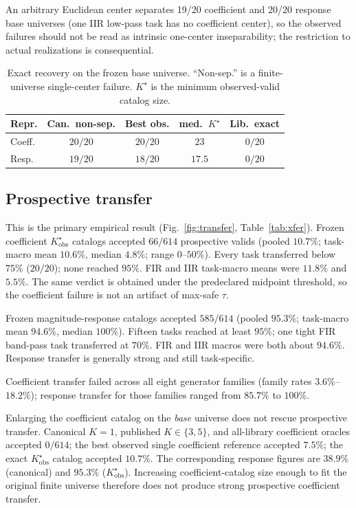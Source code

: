 \documentclass{article}
\begin{document}
An arbitrary Euclidean center separates 19/20 coefficient and
20/20 response base universes (one IIR low-pass task has no
coefficient center), so the observed failures should not be
read as intrinsic one-center inseparability; the restriction
to actual realizations is consequential.

\begin{table}[t]
\caption{Exact recovery on the frozen base universe.
``Non-sep.'' is a finite-universe single-center failure.
$K^\star$ is the minimum observed-valid catalog size.}
\label{tab:base}
\centering
\setlength{\tabcolsep}{4pt}
\begin{tabular}{@{}lcccc@{}}
\toprule
Repr. & Can.\ non-sep. & Best obs. & med.\ $K^\star$ & Lib.\ exact \\
\midrule
Coeff. & $20/20$ & $20/20$ & $23$ & $0/20$ \\
Resp.  & $19/20$ & $18/20$ & $17.5$ & $0/20$ \\
\bottomrule
\end{tabular}
\end{table}

\subsection{Prospective transfer}
This is the primary empirical result (Fig.~\ref{fig:transfer},
Table~\ref{tab:xfer}).
Frozen coefficient $K^\star_{\mathrm{obs}}$ catalogs accepted
$66/614$ prospective valids (pooled $10.7\%$; task-macro mean
$10.6\%$, median $4.8\%$; range $0$--$50\%$).
Every task transferred below $75\%$ ($20/20$); none reached
$95\%$.
FIR and IIR task-macro means were $11.8\%$ and $5.5\%$.
The same verdict is obtained under the predeclared midpoint
threshold, so the coefficient failure is not an artifact of
max-safe $\tau$.

Frozen magnitude-response catalogs accepted $585/614$ (pooled
$95.3\%$; task-macro mean $94.6\%$, median $100\%$).
Fifteen tasks reached at least $95\%$; one tight FIR band-pass
task transferred at $70\%$.
FIR and IIR macros were both about $94.6\%$.
Response transfer is generally strong and still task-specific.

Coefficient transfer failed across all eight generator families
(family rates $3.6\%$--$18.2\%$); response transfer for those
families ranged from $85.7\%$ to $100\%$.

Enlarging the coefficient catalog on the \emph{base} universe does
not rescue prospective transfer.
Canonical $K{=}1$, published $K{\in}\{3,5\}$, and all-library
coefficient oracles accepted $0/614$; the best observed single
coefficient reference accepted $7.5\%$; the exact
$K^\star_{\mathrm{obs}}$ catalog accepted $10.7\%$.
The corresponding response figures are $38.9\%$ (canonical) and
$95.3\%$ ($K^\star_{\mathrm{obs}}$).
Increasing coefficient-catalog size enough to fit the original
finite universe therefore does not produce strong prospective
coefficient transfer.
\end{document}
